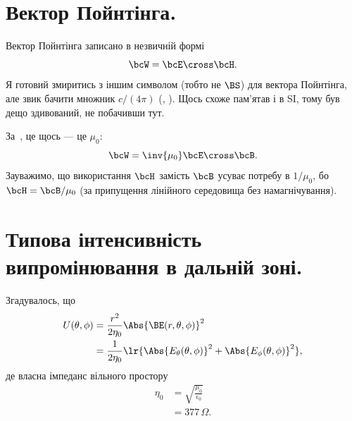 %
%
\section{Вектор Пойнтінга.}
Вектор Пойнтінга записано в незвичній формі
\begin{equation}\label{eqn:chapter2Notes:560}
\bcW = \bcE \cross \bcH.
\end{equation}
Я готовий змиритись з іншим символом (тобто не \(\BS\)) для вектора Пойнтінга, але звик бачити множник \(c/(4\pi)\) (\citep{landau1980classical}, \citep{jackson1975cew}). Щось схоже пам'ятав і в SI, тому був дещо здивований, не побачивши тут.

За~\citep{griffiths1999introduction}, це щось — це \(\mu_0\):
\begin{equation}\label{eqn:chapter2Notes:580}
\bcW = \inv{\mu_0} \bcE \cross \bcB.
\end{equation}
Зауважимо, що використання \(\bcH\) замість \(\bcB\) усуває потребу в \(1/\mu_0\), бо \(\bcH = \bcB/\mu_0\) (за припущення лінійного середовища без намагнічування).

\section{Типова інтенсивність випромінювання в дальній зоні.}
Згадувалось, що
\begin{equation}\label{eqn:advancedantennaL1:20}
\begin{aligned}
U(\theta, \phi)
&=
\frac{r^2}{2 \eta_0} \Abs{\BE(r, \theta, \phi)}^2
\\ &=
\frac{1}{2 \eta_0} \lr{\Abs{E_\theta(\theta, \phi)}^2 + \Abs{E_\phi(\theta, \phi)}^2},
\end{aligned}
\end{equation}
де власна імпеданс вільного простору
\begin{equation}\label{eqn:advancedantennaL1:480}
\begin{aligned}
\eta_0 &= \sqrt{\frac{\mu_0}{\epsilon_0}} \\ &= 377\,\Omega.
\end{aligned}
\end{equation}

